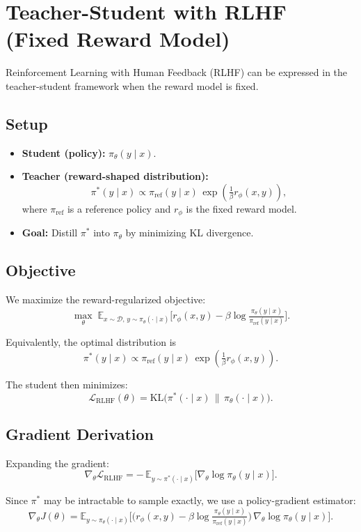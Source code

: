 \documentclass[11pt]{article}
\newcommand{\E}{\mathbb{E}}
\newcommand{\KL}{\mathrm{KL}}
\theoremstyle{remark}
\begin{document}
\section{Teacher-Student with RLHF (Fixed Reward Model)}
\label{sec:rlhf}

Reinforcement Learning with Human Feedback (RLHF) can be expressed in the
teacher-student framework when the reward model is fixed.

\subsection{Setup}
\begin{itemize}
    \item \textbf{Student (policy):} $\pi_\theta(y \mid x)$.
    \item \textbf{Teacher (reward-shaped distribution):}
    \[
    \pi^*(y \mid x) \propto \pi_{\text{ref}}(y \mid x)\,
    \exp\!\left(\tfrac{1}{\beta} r_\phi(x,y)\right),
    \]
    where $\pi_{\text{ref}}$ is a reference policy and $r_\phi$ is the fixed reward model.
    \item \textbf{Goal:} Distill $\pi^*$ into $\pi_\theta$ by minimizing KL divergence.
\end{itemize}

\subsection{Objective}
We maximize the reward-regularized objective:
\[
\max_{\theta} \;
\E_{x\sim\mathcal{D},\, y\sim\pi_\theta(\cdot\mid x)}
\Big[ r_\phi(x,y) - \beta \log \tfrac{\pi_\theta(y \mid x)}{\pi_{\text{ref}}(y \mid x)} \Big].
\]

Equivalently, the optimal distribution is
\[
\pi^*(y \mid x) \propto \pi_{\text{ref}}(y \mid x)\,\exp\!\left(\tfrac{1}{\beta}r_\phi(x,y)\right).
\]

The student then minimizes:
\[
\mathcal{L}_{\text{RLHF}}(\theta) = \KL\!\big(\pi^*(\cdot\mid x) \,\|\, \pi_\theta(\cdot\mid x)\big).
\]

\subsection{Gradient Derivation}
Expanding the gradient:
\[
\nabla_\theta \mathcal{L}_{\text{RLHF}}
= -\,\E_{y \sim \pi^*(\cdot\mid x)} \big[ \nabla_\theta \log \pi_\theta(y \mid x) \big].
\]

Since $\pi^*$ may be intractable to sample exactly, we use a policy-gradient estimator:
\[
\nabla_\theta J(\theta) =
\E_{y \sim \pi_\theta(\cdot\mid x)} \Big[
\big(r_\phi(x,y) - \beta \log \tfrac{\pi_\theta(y \mid x)}{\pi_{\text{ref}}(y \mid x)}\big)\,
\nabla_\theta \log \pi_\theta(y \mid x) \Big].
\]
\end{document}
